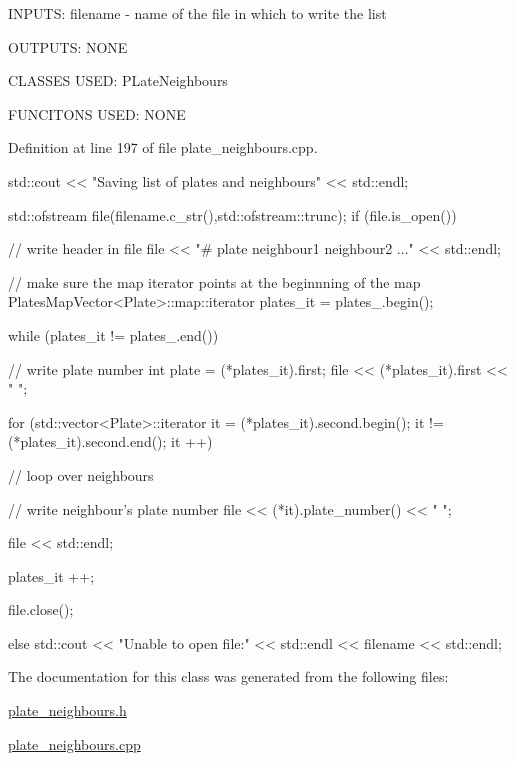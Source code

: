 I\-N\-P\-U\-T\-S\-: filename -\/ name of the file in which to write the list

O\-U\-T\-P\-U\-T\-S\-: N\-O\-N\-E

C\-L\-A\-S\-S\-E\-S U\-S\-E\-D\-: P\-Late\-Neighbours

F\-U\-N\-C\-I\-T\-O\-N\-S U\-S\-E\-D\-: N\-O\-N\-E

Definition at line 197 of file plate\-\_\-neighbours.\-cpp.


\begin{DoxyCode}
                                                   {
    std::cout << "Saving list of plates and neighbours" << std::endl;
    
    std::ofstream file(filename.c_str(),std::ofstream::trunc); 
    if (file.is_open()){
        
        // write header in file
        file << "# plate neighbour1 neighbour2 ..." << std::endl;        
        
        // make sure the map iterator points at the beginnning of the map
        PlatesMapVector<Plate>::map::iterator plates_it = plates_.begin();
        
        while (plates_it != plates_.end()){
            // write plate number
            int plate = (*plates_it).first;
            file << (*plates_it).first << " ";
            
            
            for (std::vector<Plate>::iterator it = (*plates_it).second.begin();
       it != (*plates_it).second.end(); it ++){ // loop over neighbours
                
                // write neighbour's plate number
                file << (*it).plate_number() << " ";
            }
            
            file << std::endl;
            
            plates_it ++;
        }
        
        file.close();
    }
    else{
        std::cout << "Unable to open file:" << std::endl << filename << 
      std::endl;
    }
    
}
\end{DoxyCode}


The documentation for this class was generated from the following files\-:\begin{DoxyCompactItemize}
\item 
\hyperlink{plate__neighbours_8h}{plate\-\_\-neighbours.\-h}\item 
\hyperlink{plate__neighbours_8cpp}{plate\-\_\-neighbours.\-cpp}\end{DoxyCompactItemize}
